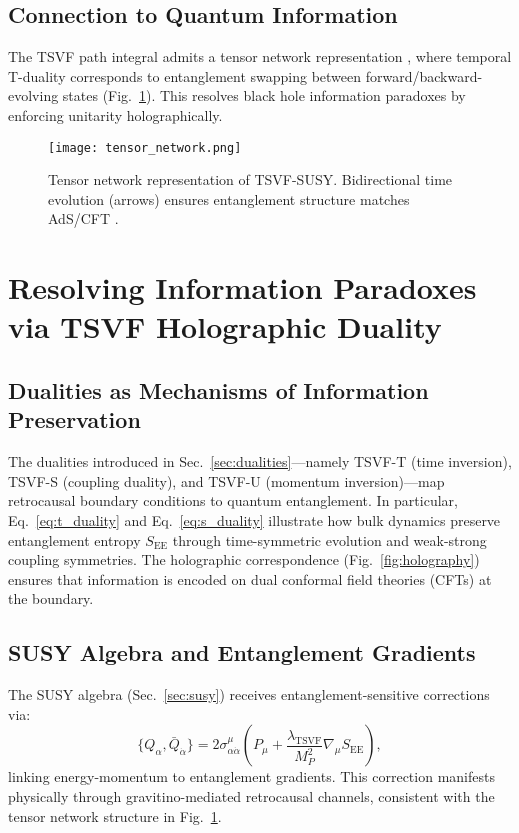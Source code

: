 \documentclass[twocolumn,superscriptaddress,floatfix]{revtex4-2}
\begin{document}
\subsection{Connection to Quantum Information}  
\label{subsec:quantum_info}  

The TSVF path integral admits a tensor network representation \cite{Swingle2012}, where temporal T-duality corresponds to entanglement swapping between forward/backward-evolving states (Fig.~\ref{fig:tensor_network}). This resolves black hole information paradoxes \cite{Almheiri2020} by enforcing unitarity holographically.  

\begin{figure}[htbp]  
\centering  
\texttt{[image: tensor\_network.png]}  
\caption{Tensor network representation of TSVF-SUSY. Bidirectional time evolution (arrows) ensures entanglement structure matches AdS/CFT \cite{VanRaamsdonk2010}.}  
\label{fig:tensor_network}  
\end{figure}  

\section{Resolving Information Paradoxes via TSVF Holographic Duality}
\label{sec:info_paradox}

\subsection{Dualities as Mechanisms of Information Preservation}
\label{subsec:dual_preserve}

The dualities introduced in Sec.~\ref{sec:dualities}—namely TSVF-T (time inversion), TSVF-S (coupling duality), and TSVF-U (momentum inversion)—map retrocausal boundary conditions to quantum entanglement. In particular, Eq.~\ref{eq:t_duality} and Eq.~\ref{eq:s_duality} illustrate how bulk dynamics preserve entanglement entropy $S_{\text{EE}}$ through time-symmetric evolution and weak-strong coupling symmetries. The holographic correspondence (Fig.~\ref{fig:holography}) ensures that information is encoded on dual conformal field theories (CFTs) at the boundary.

\subsection{SUSY Algebra and Entanglement Gradients}
\label{subsec:susy_ent_grad}

The SUSY algebra (Sec.~\ref{sec:susy}) receives entanglement-sensitive corrections via:
\begin{equation}
\{Q_\alpha, \bar{Q}_{\dot{\alpha}}\} = 2\sigma^\mu_{\alpha\dot{\alpha}} \left( P_\mu + \frac{\lambda_{\text{TSVF}}}{M_P^2} \nabla_\mu S_{\text{EE}} \right),
\end{equation}
linking energy-momentum to entanglement gradients. This correction manifests physically through gravitino-mediated retrocausal channels, consistent with the tensor network structure in Fig.~\ref{fig:tensor_network}.
\end{document}
